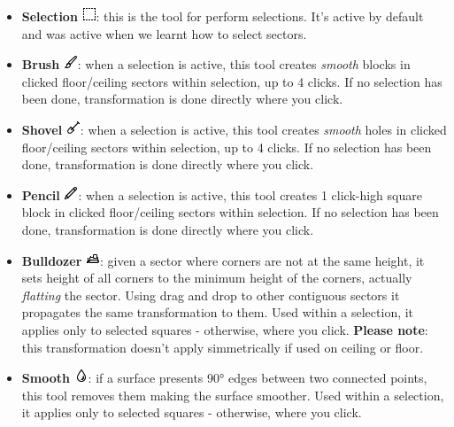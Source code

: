 \begin{itemize}
    \item \textbf{Selection} \includegraphics[scale=0.5]{Resources/icons_toolbox/toolbox_Selection-16.png}: this is the tool for perform selections. It's active by default and was active when we learnt how to select sectors.
    \item \textbf{Brush} \includegraphics[scale=0.5]{Resources/icons_toolbox/toolbox_Paint-16.png}: when a selection is active, this tool creates \emph{smooth} blocks in  clicked floor/ceiling sectors within selection, up to 4 clicks. If no selection has been done, transformation is done directly where you click.
    \item \textbf{Shovel} \includegraphics[scale=0.5]{Resources/icons_toolbox/toolbox_Shovel-16.png}: when a selection is active, this tool creates \emph{smooth} holes in  clicked floor/ceiling sectors within selection, up to 4 clicks. If no selection has been done, transformation is done directly where you click.
    \item \textbf{Pencil} \includegraphics[scale=0.5]{Resources/icons_toolbox/toolbox_Pencil-16.png}: when a selection is active, this tool creates 1 click-high square block in  clicked floor/ceiling sectors within selection. If no selection has been done, transformation is done directly where you click.
    \item \textbf{Bulldozer} \includegraphics[scale=0.5]{Resources/icons_toolbox/toolbox_Bulldozer_1-16.png}: given a sector where corners are not at the same height, it sets height of all corners to the minimum height of the corners, actually \emph{flatting} the sector. Using drag and drop to other contiguous sectors it propagates the same transformation to them. Used within a selection, it applies only to selected squares - otherwise, where you click. \textbf{Please note}: this transformation doesn't apply simmetrically if used on ceiling or floor.
    \item \textbf{Smooth} \includegraphics[scale=0.5]{Resources/icons_toolbox/toolbox_Smooth-16.png}: if a surface presents 90° edges between two connected points, this tool removes them making the surface smoother. Used within a selection, it applies only to selected squares - otherwise, where you click.
\end{itemize}

